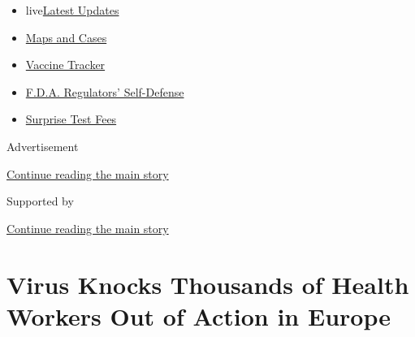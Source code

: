 \begin{itemize}
\tightlist
\item
  live\href{https://www.nytimes3xbfgragh.onion/2020/09/11/world/covid-19-coronavirus.html?name=styln-coronavirus-national\&region=TOP_BANNER\&block=storyline_menu_recirc\&action=click\&pgtype=Article\&impression_id=7b36d271-f4c0-11ea-b722-756f4ec0fc54\&variant=undefined}{Latest
  Updates}
\item
  \href{https://www.nytimes3xbfgragh.onion/interactive/2020/us/coronavirus-us-cases.html?name=styln-coronavirus-national\&region=TOP_BANNER\&block=storyline_menu_recirc\&action=click\&pgtype=Article\&impression_id=7b36d272-f4c0-11ea-b722-756f4ec0fc54\&variant=undefined}{Maps
  and Cases}
\item
  \href{https://www.nytimes3xbfgragh.onion/interactive/2020/science/coronavirus-vaccine-tracker.html?name=styln-coronavirus-national\&region=TOP_BANNER\&block=storyline_menu_recirc\&action=click\&pgtype=Article\&impression_id=7b36d273-f4c0-11ea-b722-756f4ec0fc54\&variant=undefined}{Vaccine
  Tracker}
\item
  \href{https://www.nytimes3xbfgragh.onion/2020/09/10/us/politics/fda-coronavirus-vaccine.html?name=styln-coronavirus-national\&region=TOP_BANNER\&block=storyline_menu_recirc\&action=click\&pgtype=Article\&impression_id=7b36d274-f4c0-11ea-b722-756f4ec0fc54\&variant=undefined}{F.D.A.
  Regulators' Self-Defense}
\item
  \href{https://www.nytimes3xbfgragh.onion/2020/09/09/upshot/coronavirus-surprise-test-fees.html?name=styln-coronavirus-national\&region=TOP_BANNER\&block=storyline_menu_recirc\&action=click\&pgtype=Article\&impression_id=7b36f980-f4c0-11ea-b722-756f4ec0fc54\&variant=undefined}{Surprise
  Test Fees}
\end{itemize}

Advertisement

\protect\hyperlink{after-top}{Continue reading the main story}

Supported by

\protect\hyperlink{after-sponsor}{Continue reading the main story}

\hypertarget{virus-knocks-thousands-of-health-workers-out-of-action-in-europe}{%
\section{Virus Knocks Thousands of Health Workers Out of Action in
Europe}\label{virus-knocks-thousands-of-health-workers-out-of-action-in-europe}}

